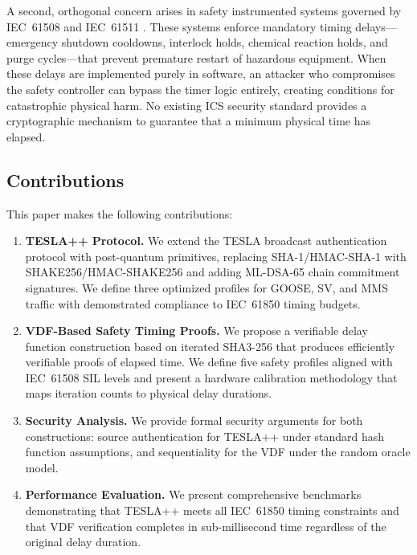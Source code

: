 \documentclass[conference,10pt]{IEEEtran}
\newcommand{\GOOSE}{\textsf{GOOSE}}
\newcommand{\SV}{\textsf{SV}}
\newcommand{\MMS}{\textsf{MMS}}
\begin{document}
A second, orthogonal concern arises in safety instrumented systems governed by IEC~61508 and IEC~61511 \cite{iec61508,iec61511}. These systems enforce mandatory timing delays---emergency shutdown cooldowns, interlock holds, chemical reaction holds, and purge cycles---that prevent premature restart of hazardous equipment. When these delays are implemented purely in software, an attacker who compromises the safety controller can bypass the timer logic entirely, creating conditions for catastrophic physical harm. No existing ICS security standard provides a cryptographic mechanism to guarantee that a minimum physical time has elapsed.

\subsection{Contributions}

This paper makes the following contributions:

\begin{enumerate}
  \item \textbf{TESLA++ Protocol.} We extend the TESLA broadcast authentication protocol \cite{perrig2000tesla,perrig2002tesla} with post-quantum primitives, replacing SHA-1/HMAC-SHA-1 with SHAKE256/HMAC-SHAKE256 and adding ML-DSA-65 chain commitment signatures. We define three optimized profiles for \GOOSE{}, \SV{}, and \MMS{} traffic with demonstrated compliance to IEC~61850 timing budgets.

  \item \textbf{VDF-Based Safety Timing Proofs.} We propose a verifiable delay function construction based on iterated SHA3-256 that produces efficiently verifiable proofs of elapsed time. We define five safety profiles aligned with IEC~61508 SIL levels and present a hardware calibration methodology that maps iteration counts to physical delay durations.

  \item \textbf{Security Analysis.} We provide formal security arguments for both constructions: source authentication for TESLA++ under standard hash function assumptions, and sequentiality for the VDF under the random oracle model.

  \item \textbf{Performance Evaluation.} We present comprehensive benchmarks demonstrating that TESLA++ meets all IEC~61850 timing constraints and that VDF verification completes in sub-millisecond time regardless of the original delay duration.
\end{enumerate}
\end{document}
